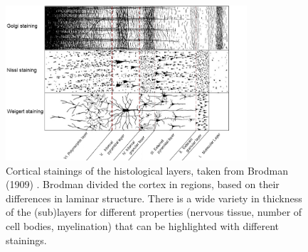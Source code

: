 \begin{figure}[ht]
	\centering
	\includegraphics[width=0.8\textwidth, clip=true]{./Chapters/01_Introduction/Images/Layers}
	\caption{Cortical stainings of the histological layers, taken from Brodman (1909) \cite{Brodmann1909}. Brodman divided the cortex in regions, based on their differences in laminar structure. There is a wide variety in thickness of the (sub)layers for different properties (nervous tissue, number of cell bodies, myelination) that can be highlighted with different stainings.}
	\label{fig:layers}
\end{figure}